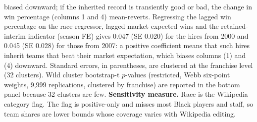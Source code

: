 \begin{table}[!h]
{\begin{threeparttable}
\begin{tablenotes}[para]
biased downward; if the inherited record is transiently good or bad, the change in win percentage (columns 1 and 4) mean-reverts. Regressing the lagged win percentage on the race regressor, lagged market expected wins and the retained-interim indicator (season FE) gives 0.047 (SE 0.020) for the hires from 2000 and 0.045 (SE 0.028) for those from 2007: a positive coefficient means that such hires inherit teams that beat their market expectation, which biases columns (1) and (4) downward. Standard errors, in parentheses, are clustered at the franchise level (32 clusters). Wild cluster bootstrap-t $p$-values (restricted, Webb six-point weights, 9,999 replications, clustered by franchise) are reported in the bottom panel because 32 clusters are few. \textbf{Sensitivity measure.} Race is the Wikipedia category flag. The flag is positive-only and misses most Black players and staff, so team shares are lower bounds whose coverage varies with Wikipedia editing.
\end{tablenotes}
\end{threeparttable}}
\end{table}
